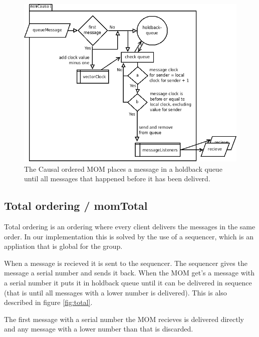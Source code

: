 \documentclass[english]{article}
\begin{document}
\begin{figure}
\includegraphics[width=\textwidth]{momCausal.png}
\caption{The Causal ordered MOM places a message in a holdback queue until all messages that happened before it has been deliverd.}
\label{fig:causal}
\end{figure}

\subsection{Total ordering / momTotal}
\label{mo-total}
Total ordering is an ordering where every client delivers the messages in the same order. In our implementation this is solved by the use of a sequencer, which is an appliation that is global for the group. 

When a message is recieved it is sent to the sequencer. The sequencer gives the message a serial number and sends it back. When the MOM get's a message with a serial number it puts it in holdback queue until it can be delivered in sequence (that is until all messages with a lower number is delivered). This is also described in figure \vref{fig:total}.

The first message with a serial number the MOM recieves is delivered directly and any message with a lower number than that is discarded.
\end{document}
